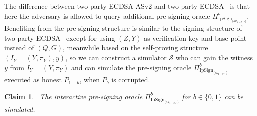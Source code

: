\documentclass{llncs}
\newtheorem{Claim}{Claim}
\begin{document}
The difference between two-party ECDSA-ASv2 and two-party ECDSA~\cite{Lin17} is that here the adversary is allowed to query additional pre-signing oracle $\Pi^b_{\text{IpSign}_{\langle sk_{1-b},\cdot \rangle}}$. Benefiting from the pre-signing structure is similar to the signing structure of two-party ECDSA~\cite{Lin17} except for using $(Z, Y)$ as verification key and base point instead of $(Q, G)$, meanwhile based on the self-proving structure $(I_Y=(Y,\pi_Y),y)$, so we can  construct a simulator $\mathcal{S}$ who can gain the witness $y$ from $I_Y=(Y,\pi_Y)$ and can simulate the pre-signing oracle $\Pi^b_{\text{IpSign}_{\langle sk_{1-b},\cdot \rangle}}$ executed as honest $P_{1-b}$, when $P_b$ is corrupted. 

\begin{Claim}~\label{interactive pre-signing oracle}
The interactive pre-signing oracle $\Pi^b_{\text{IpSign}_{\langle sk_{1-b},\cdot \rangle}}$ for $b\in\{0,1\}$ can be simulated.
\end{Claim}
\end{document}

